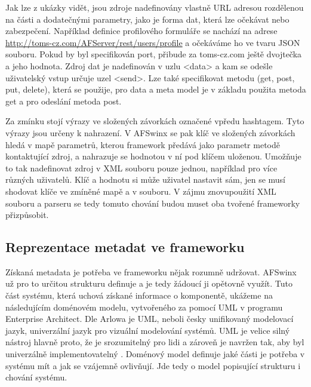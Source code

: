 Jak lze z ukázky vidět, jsou zdroje nadefinovány vlastně URL adresou rozdělenou na části a dodatečnými parametry, jako je forma dat, která lze očekávat nebo zabezpečení. Například definice profilového formuláře se nachází na adrese \url{http://toms-cz.com/AFServer/rest/users/profile} a očekáváme ho ve tvaru JSON souboru. Pokud by byl specifikován port, přibude za toms-cz.com ještě dvojtečka a jeho hodnota. Zdroj dat je nadefinován v uzlu <data> a kam se odešle uživatelský vstup určuje uzel <send>. Lze také specifikovat metodu (get, post, put, delete), která se použije, pro data a meta model je v základu použita metoda get a pro odeslání metoda post.

Za zmínku stojí výrazy ve složených závorkách označené vpředu hashtagem. Tyto výrazy jsou určeny k nahrazení. V AFSwinx se pak klíč ve složených závorkách hledá v mapě parametrů, kterou framework předává jako parametr metodě kontaktující zdroj, a nahrazuje se hodnotou v ní pod klíčem uloženou. Umožňuje to tak nadefinovat zdroj v XML souboru pouze jednou, například pro více různých uživatelů. Klíč a hodnotu si může uživatel nastavit sám, jen se musí shodovat klíče ve zmíněné mapě a v souboru. V zájmu znovupoužití XML souboru a parseru se tedy tomuto chování budou muset oba tvořené frameworky přizpůsobit.

\subsection{Reprezentace metadat ve frameworku}
Získaná metadata je potřeba ve frameworku nějak rozumně udržovat. AFSwinx už pro to určitou strukturu definuje a je tedy žádoucí ji opětovně využít. Tuto část systému, která uchová získané informace o komponentě, ukážeme na následujícím doménovém modelu, vytvořeného za pomocí UML v programu Enterprise Architect. Dle Arlowa je UML, neboli česky unifikovaný modelovací jazyk, univerzální jazyk pro vizuální modelování systémů. UML je velice silný nástroj hlavně proto, že je srozumitelný pro lidi a zároveň je navržen tak, aby byl univerzálně implementovatelný \cite{viz-plocha-citace-arlow}. Doménový model definuje jaké části je potřeba v systému mít a jak se vzájemně ovlivňují. Jde tedy o model popisující strukturu i chování systému.


